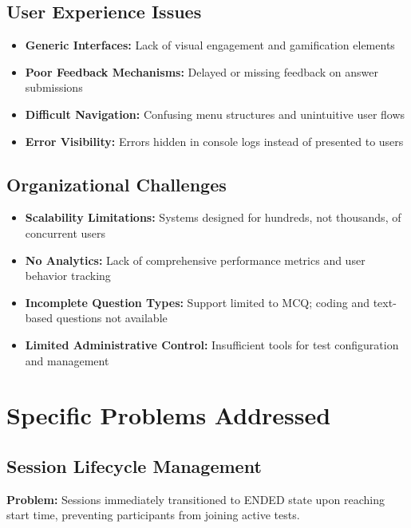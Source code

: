 \documentclass[12pt,a4paper]{report}
\begin{document}
\subsection{User Experience Issues}

\begin{itemize}[left=0pt]
  \item \textbf{Generic Interfaces:} Lack of visual engagement and gamification elements
  \item \textbf{Poor Feedback Mechanisms:} Delayed or missing feedback on answer submissions
  \item \textbf{Difficult Navigation:} Confusing menu structures and unintuitive user flows
  \item \textbf{Error Visibility:} Errors hidden in console logs instead of presented to users
\end{itemize}

\subsection{Organizational Challenges}

\begin{itemize}[left=0pt]
  \item \textbf{Scalability Limitations:} Systems designed for hundreds, not thousands, of concurrent users
  \item \textbf{No Analytics:} Lack of comprehensive performance metrics and user behavior tracking
  \item \textbf{Incomplete Question Types:} Support limited to MCQ; coding and text-based questions not available
  \item \textbf{Limited Administrative Control:} Insufficient tools for test configuration and management
\end{itemize}

\section{Specific Problems Addressed}

\subsection{Session Lifecycle Management}

\textbf{Problem:} Sessions immediately transitioned to ENDED state upon reaching start time, preventing participants from joining active tests.
\end{document}

